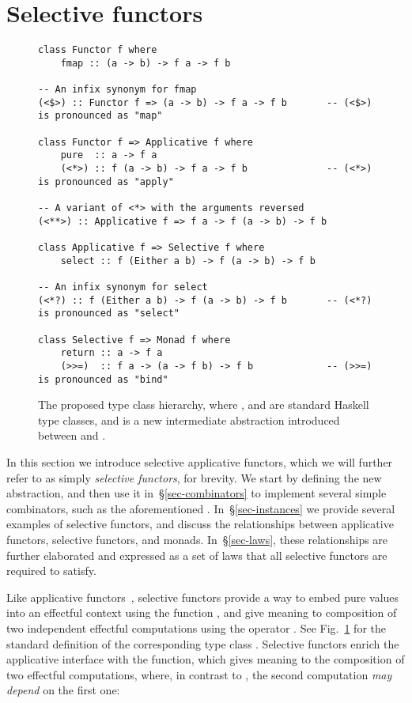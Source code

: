 \section{Selective functors}\label{sec-selective}

\begin{figure}
\begin{verbatim}
class Functor f where
    fmap :: (a -> b) -> f a -> f b

-- An infix synonym for fmap
(<$>) :: Functor f => (a -> b) -> f a -> f b       -- (<$>) is pronounced as "map"

class Functor f => Applicative f where
    pure  :: a -> f a
    (<*>) :: f (a -> b) -> f a -> f b              -- (<*>) is pronounced as "apply"

-- A variant of <*> with the arguments reversed
(<**>) :: Applicative f => f a -> f (a -> b) -> f b

class Applicative f => Selective f where
    select :: f (Either a b) -> f (a -> b) -> f b

-- An infix synonym for select
(<*?) :: f (Either a b) -> f (a -> b) -> f b       -- (<*?) is pronounced as "select"

class Selective f => Monad f where
    return :: a -> f a
    (>>=)  :: f a -> (a -> f b) -> f b             -- (>>=) is pronounced as "bind"
\end{verbatim}
\caption{The proposed type class hierarchy, where , 
and  are standard Haskell type classes, and  is
a new intermediate abstraction introduced between  and
.}\label{fig-types}
\end{figure}

In this section we introduce selective applicative functors, which we will
further refer to as simply \emph{selective functors}, for brevity. We start by
defining the new abstraction, and then use it in~\S\ref{sec-combinators} to
implement several simple combinators, such as the aforementioned .
In~\S\ref{sec-instances} we provide several examples of selective functors, and
discuss the relationships between applicative functors, selective functors, and
monads. In~\S\ref{sec-laws}, these relationships are further elaborated and
expressed as a set of laws that all selective functors are required to satisfy.

Like applicative functors~\citep{mcbride2008applicative}, selective functors
provide a way to embed pure values into an effectful context  using the
function , and give meaning to composition of two independent effectful
computations using the operator \hs{<*>}. See Fig.~\ref{fig-types} for the
standard definition of the corresponding type class . Selective
functors enrich the applicative interface with the  function, which
gives meaning to the composition of two effectful computations, where, in
contrast to \hs{<*>}, the second computation \emph{may depend} on the first one:

